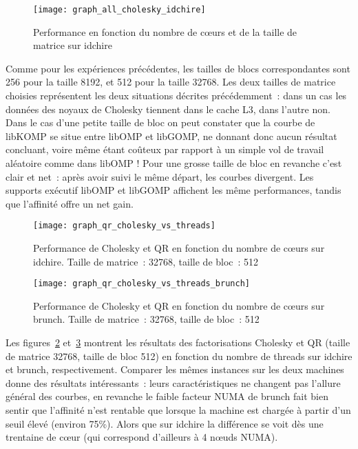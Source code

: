 \begin{figure}[ht]
  \centering
  \texttt{[image: graph\_all\_cholesky\_idchire]}
  \caption{Performance en fonction du nombre de cœurs et de la taille de matrice sur idchire}\label{fig:contribs:perf_eval:eval-cholesky-idchire}
\end{figure}

Comme pour les expériences précédentes, les tailles de blocs correspondantes sont 256 pour la taille 8192, et 512 pour la taille 32768.
Les deux tailles de matrice choisies représentent les deux situations décrites précédemment~: dans un cas les données des noyaux de Cholesky tiennent dans le cache L3, dans l'autre non.
Dans le cas d'une petite taille de bloc on peut constater que la courbe de libKOMP se situe entre libOMP et libGOMP, ne donnant donc aucun résultat concluant, voire même étant coûteux par rapport à un simple vol de travail aléatoire comme dans libOMP !
Pour une grosse taille de bloc en revanche c'est clair et net~: après avoir suivi le même départ, les courbes divergent. Les supports exécutif libOMP et libGOMP affichent les même performances, tandis que l'affinité offre un net gain.

\begin{figure}[t!]
  \centering
  \texttt{[image: graph\_qr\_cholesky\_vs\_threads]}
  \caption{Performance de Cholesky et QR en fonction du nombre de cœurs sur idchire. Taille de matrice~: 32768, taille de bloc~: 512}\label{fig:contribs:perf_eval:eval-qr-cholesky-idchire}
\end{figure}
\begin{figure}[h!]
  \centering
  \texttt{[image: graph\_qr\_cholesky\_vs\_threads\_brunch]}
  \caption{Performance de Cholesky et QR en fonction du nombre de cœurs sur brunch. Taille de matrice~: 32768, taille de bloc~: 512}\label{fig:contribs:perf_eval:eval-qr-cholesky-brunch}
\end{figure}

Les figures~\ref{fig:contribs:perf_eval:eval-qr-cholesky-idchire} et~\ref{fig:contribs:perf_eval:eval-qr-cholesky-brunch} montrent les résultats des factorisations Cholesky et QR (taille de matrice 32768, taille de bloc 512) en fonction du nombre de threads sur idchire et brunch, respectivement.
Comparer les mêmes instances sur les deux machines donne des résultats intéressants~: leurs caractéristiques ne changent pas l'allure général des courbes, en revanche le faible facteur NUMA de brunch fait bien sentir que l'affinité n'est rentable que lorsque la machine est chargée à partir d'un seuil élevé (environ 75\%).
Alors que sur idchire la différence se voit dès une trentaine de cœur (qui correspond d'ailleurs à 4 nœuds NUMA).

